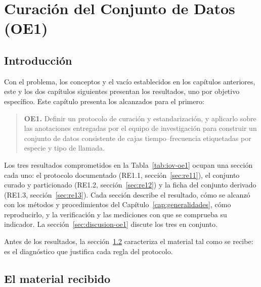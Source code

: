 \chapter{Curación del Conjunto de Datos (OE1)}
\label{cap:curacion}

\newcommand{\figOE}{capitulos/04_oe1_curacion/figures}

\section{Introducción}

Con el problema, los conceptos y el vacío establecidos en los capítulos
anteriores, este y los dos capítulos siguientes presentan los
resultados, uno por objetivo específico. Este capítulo presenta los alcanzados
para el primero:

\begin{quote}
    \textbf{OE1.} Definir un protocolo de curación y estandarización, y aplicarlo
    sobre las anotaciones entregadas por el equipo de investigación para construir
    un conjunto de datos consistente de cajas tiempo--frecuencia etiquetadas por
    especie y tipo de llamada.
\end{quote}

Los tres resultados comprometidos en la Tabla~\ref{tab:iov-oe1} ocupan una
sección cada uno: el protocolo documentado (RE1.1, sección~\ref{sec:re11}), el
conjunto curado y particionado (RE1.2, sección~\ref{sec:re12}) y la ficha del
conjunto derivado (RE1.3, sección~\ref{sec:re13}). Cada sección describe el
resultado, cómo se alcanzó con los métodos y procedimientos del
Capítulo~\ref{cap:generalidades}, cómo reproducirlo, y la verificación y las
mediciones con que se comprueba su indicador. La sección~\ref{sec:discusion-oe1}
discute los tres en conjunto.

Antes de los resultados, la sección~\ref{sec:material} caracteriza el material
tal como se recibe: es el diagnóstico que justifica cada regla del protocolo.

\section{El material recibido}
\label{sec:material}

